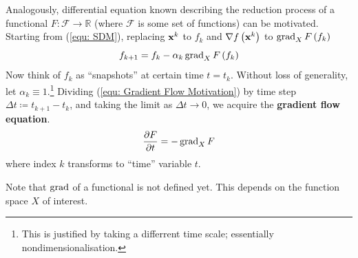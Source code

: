 \documentclass[../dissertation.tex]{subfiles}
\begin{document}
Analogously, differential equation known describing the reduction process of a functional $F:\mathcal{F} \rightarrow \mathbb{R}$ (where $\mathcal{F}$ is some set of functions) can be motivated.
Starting from (\ref{equ: SDM}), replacing $\mathbf{x}^{k}$ to $f_k$ and $\nabla f\left( \mathbf{x}^k \right)$ to $\operatorname{grad}_X F\left( f_k \right)$
\begin{equation}
    f_{k+1} = f_k - \alpha_k \operatorname{grad}_X F \left( f_k \right)
    \label{equ: Gradient Flow Motivation}
\end{equation}
Now think of $f_k$ as ``snapshots'' at certain time $t = t_k$.
Without loss of generality, let $\alpha_k \equiv 1$.\footnote{
This is justified by taking a differrent time scale; essentially nondimensionalisation.}
Dividing (\ref{equ: Gradient Flow Motivation}) by time step $\Delta t \coloneqq t_{k+1} - t_k$,
and taking the limit as $\Delta t \rightarrow 0$,
we acquire the \textbf{gradient flow equation}\cite{YSC2021}.
\begin{equation}
    \frac{\partial F}{\partial t} = - \operatorname{grad}_X F
\end{equation}
where index $k$ transforms to ``time'' variable $t$.

Note that $\operatorname{grad}$ of a functional is not defined yet. This depends on the function space $X$ of interest.
\end{document}

